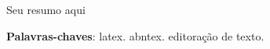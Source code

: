 \setlength{\absparsep}{18pt} %
\begin{resumo}
 Seu resumo aqui

 \textbf{Palavras-chaves}: latex. abntex. editoração de texto.
\end{resumo}